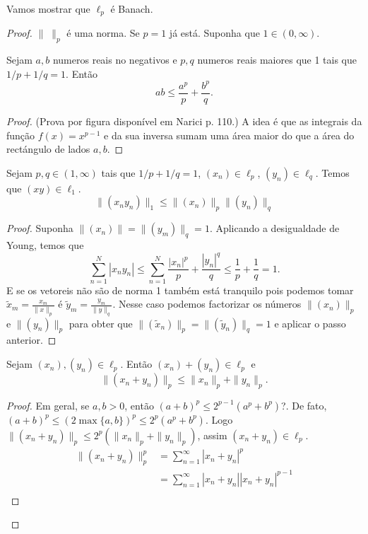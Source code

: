 \documentclass[portuguese]{article}
\theoremstyle{definition}
\begin{document}
	\begin{exer}
		Vamos mostrar que $\ell_p$ é Banach.
		\begin{proof}
			$\|\;\|_p$ é uma norma. Se $p=1$ já está. Suponha que $1\in (0,\infty)$.
			\begin{af}
				Sejam $a,b$ numeros reais no negativos e $p,q$ numeros reais maiores que 1 tais que $1/p+1/q=1$. Então
				\[ab\leq\frac{a^p}{p}+\frac{b^p}{q}.\]
			\end{af}
			\begin{proof}
				
				(Prova por figura disponível em Narici p. 110.) A idea é que as integrais da função $f(x)=x^{p-1}$ e da sua inversa sumam uma área maior do que a área do rectángulo de lados $a,b$.
			\end{proof}
			\begin{af}
				Sejam $p,q\in(1,\infty)$ tais que $1/p+1/q=1$, $(x_n)\in\ell_p$, $(y_n)\in\ell_q$. Temos que $(xy)\in\ell_1$.
				\[\|(x_ny_n)\|_1\leq\|(x_n)\|_p\|(y_n)\|_q\]
			\end{af}
			\begin{proof}
				Suponha $\| (x_n)\|=\| (y_m)\|_q=1$. Aplicando a desigualdade de Young, temos que
				\[\sum_{n=1}^N|x_ny_n|\leq\sum_{n=1}^N\frac{|x_n|^p}{p}+\frac{|y_n|^q}{q}\leq\frac{1}{p}+\frac{1}{q}=1.\]
				E se os vetoreis não são de norma 1 também está tranquilo pois podemos tomar $\tilde{x}_m=\frac{x_m}{\| x\|_p}$ é $\tilde{y}_m=\frac{y_m}{\| y\|_q}$. Nesse caso podemos factorizar os números $\| (x_n)\|_p$ e $\| (y_n)\|_p$ para obter que $\|(\tilde{x}_n)\|_p=\| (\tilde{y}_n)\|_q=1$ e aplicar o passo anterior.
			\end{proof}
			\begin{af}
				Sejam $(x_n),(y_n)\in\ell_p$. Então $(x_n)+(y_n)\in\ell_p$ e 
				\[\|(x_n+y_n)\|_p\leq\| x_n\|_p+\| y_n\|_p.\]
			\end{af}
			\begin{proof}
				Em geral, se $a,b>0$, então $(a+b)^p\leq2^{p-1}(a^p+b^p)$?. De fato, $(a+b)^p\leq (2\max\{a,b\})^p\leq 2^p(a^p+b^p)$. Logo $\| (x_n+y_n)\|_p\leq 2^p(\|x_n\|_p+\|y_n\|_p)$, assim $(x_n+y_n)\in\ell_p$.
				\begin{align*}
					\|(x_n+y_n)\|^p_p&=\sum_{n=1}^\infty|x_n+y_n|^p\\
					&=\sum_{n=1}^\infty|x_n+y_n||x_n+y_n|^{p-1}\\

\end{align*}
\end{proof}
\end{proof}
\end{exer}
\end{document}

